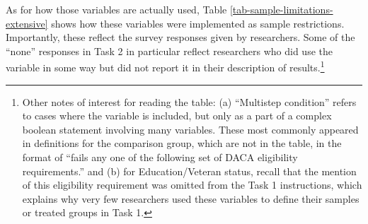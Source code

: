 \documentclass[
  letterpaper,
  DIV=11,
  numbers=noendperiod]{scrartcl}
\begin{document}
\begin{table}[!htbp] \centering \renewcommand*{\arraystretch}{1.1}\caption{Number of Variables Referred to in Sample Limitations}\label{tab-number-of-sample-limitations}
\end{table}

As for how those variables are actually used, Table
\ref{tab-sample-limitations-extensive} shows how these variables were
implemented as sample restrictions. Importantly, these reflect the
survey responses given by researchers. Some of the ``none'' responses in
Task 2 in particular reflect researchers who did use the variable in
some way but did not report it in their description of
results.\footnote{Other notes of interest for reading the table: (a)
  ``Multistep condition'' refers to cases where the variable is
  included, but only as a part of a complex boolean statement involving
  many variables. These most commonly appeared in definitions for the
  comparison group, which are not in the table, in the format of ``fails
  any one of the following set of DACA eligibility requirements.'' and
  (b) for Education/Veteran status, recall that the mention of this
  eligibility requirement was omitted from the Task 1 instructions,
  which explains why very few researchers used these variables to define
  their samples or treated groups in Task 1.}
\end{document}
